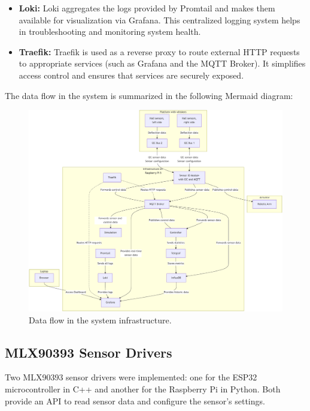 \begin{itemize}
    \item \textbf{Loki:}
    Loki aggregates the logs provided by Promtail and makes them available for visualization via Grafana.
    This centralized logging system helps in troubleshooting and monitoring system health.

    \item \textbf{Traefik:}
    Traefik is used as a reverse proxy to route external HTTP requests to appropriate services (such as Grafana and the MQTT Broker).
    It simplifies access control and ensures that services are securely exposed.
\end{itemize}

\noindent The data flow in the system is summarized in the following Mermaid diagram:

\begin{figure}[H]
    \centering
    \includegraphics[width=\textwidth]{figures/services}
    \caption{Data flow in the system infrastructure.}
    \label{fig:data_flow}
\end{figure}


\subsection{MLX90393 Sensor Drivers}
Two MLX90393 sensor drivers were implemented: one for the ESP32 microcontroller in C++ and another for the Raspberry Pi in Python.
Both provide an API to read sensor data and configure the sensor's settings.
